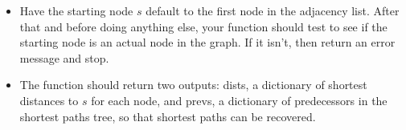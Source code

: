 \documentclass[12pt]{article}
\begin{document}
\begin{enumerate}
\begin{itemize}
\begin{itemize}
            \item Have the starting node $s$ default to the first node in the adjacency list. After that and before doing anything else, your function should test to see if the starting node is an actual node in the graph. If it isn't, then return an error message and stop.
            \item The function should return two outputs: dists, a dictionary of shortest distances to $s$ for each node, and prevs, a dictionary of predecessors in the shortest paths tree, so that shortest paths can be recovered. 
        \end{itemize} 
    \end{itemize}
    
\end{enumerate}
\end{document}
